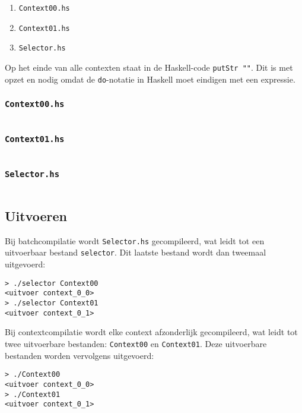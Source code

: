 \begin{enumerate}
    \item \texttt{Context00.hs}
    \item \texttt{Context01.hs}
    \item \texttt{Selector.hs}
\end{enumerate}

Op het einde van alle contexten staat in de Haskell-code \texttt{putStr ""}.
Dit is met opzet en nodig omdat de \texttt{do}-notatie in Haskell moet eindigen met een expressie.

\subsubsection{\texttt{Context00.hs}}

\inputminted{haskell}{sources/echo/Context00.hs}

\subsubsection{\texttt{Context01.hs}}

\inputminted{haskell}{sources/echo/Context01.hs}

\subsubsection{\texttt{Selector.hs}}

\inputminted{haskell}{sources/echo/Selector.hs}

\subsection{Uitvoeren}\label{subsec:echo-haskell-uitvoeren}

Bij batchcompilatie wordt \texttt{Selector.hs} gecompileerd, wat leidt tot een uitvoerbaar bestand \texttt{selector}.
Dit laatste bestand wordt dan tweemaal uitgevoerd:

\begin{verbatim}
> ./selector Context00
<uitvoer context_0_0>
> ./selector Context01
<uitvoer context_0_1>
\end{verbatim}

Bij contextcompilatie wordt elke context afzonderlijk gecompileerd, wat leidt tot twee uitvoerbare bestanden: \texttt{Context00} en \texttt{Context01}.
Deze uitvoerbare bestanden worden vervolgens uitgevoerd:

\begin{verbatim}
> ./Context00
<uitvoer context_0_0>
> ./Context01
<uitvoer context_0_1>
\end{verbatim}

